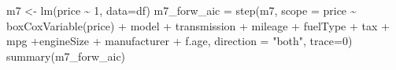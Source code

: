 \documentclass[
]{article}
\newenvironment{Shaded}{\begin{snugshade}}{\end{snugshade}}
\newcommand{\AttributeTok}[1]{\textcolor[rgb]{0.77,0.63,0.00}{#1}}
\newcommand{\DecValTok}[1]{\textcolor[rgb]{0.00,0.00,0.81}{#1}}
\newcommand{\FunctionTok}[1]{\textcolor[rgb]{0.00,0.00,0.00}{#1}}
\newcommand{\NormalTok}[1]{#1}
\newcommand{\OtherTok}[1]{\textcolor[rgb]{0.56,0.35,0.01}{#1}}
\newcommand{\SpecialCharTok}[1]{\textcolor[rgb]{0.00,0.00,0.00}{#1}}
\newcommand{\StringTok}[1]{\textcolor[rgb]{0.31,0.60,0.02}{#1}}
\begin{document}
\begin{Shaded}
\begin{Highlighting}[]
\NormalTok{m7 }\OtherTok{\textless{}{-}} \FunctionTok{lm}\NormalTok{(price }\SpecialCharTok{\textasciitilde{}}  \DecValTok{1}\NormalTok{, }\AttributeTok{data=}\NormalTok{df)}
\NormalTok{m7\_forw\_aic }\OtherTok{=} \FunctionTok{step}\NormalTok{(m7,}
\AttributeTok{scope =}\NormalTok{ price }\SpecialCharTok{\textasciitilde{}} \FunctionTok{boxCoxVariable}\NormalTok{(price) }\SpecialCharTok{+}\NormalTok{ model }\SpecialCharTok{+}\NormalTok{ transmission }\SpecialCharTok{+}\NormalTok{ mileage }\SpecialCharTok{+}\NormalTok{ fuelType }\SpecialCharTok{+}\NormalTok{ tax }\SpecialCharTok{+}\NormalTok{ mpg }\SpecialCharTok{+}\NormalTok{engineSize }\SpecialCharTok{+}\NormalTok{ manufacturer }\SpecialCharTok{+}\NormalTok{ f.age, }\AttributeTok{direction =} \StringTok{"both"}\NormalTok{, }\AttributeTok{trace=}\DecValTok{0}\NormalTok{)}
\FunctionTok{summary}\NormalTok{(m7\_forw\_aic)}
\end{Highlighting}
\end{Shaded}
\end{document}
